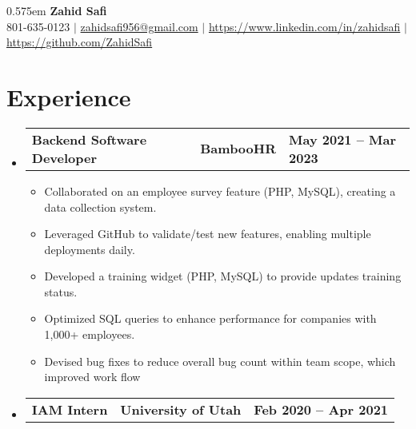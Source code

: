 \documentclass[letterpaper,12pt]{article}
\def\namespaceskip{0.575em}
\begin{document}
\begin{center}
    \spaceskip \namespaceskip \relax
  \textbf{\Huge{Zahid Safi}} \\ \vspace{1pt}
    \small 801-635-0123 $|$ \href{mailto:zahidsafi956@gmail.com}{{zahidsafi956@gmail.com}} $|$ 
    \href{https://www.linkedin.com/in/zahidsafi}{{https://www.linkedin.com/in/zahidsafi}} $|$
    \href{https://github.com/ZahidSafi}{{https://github.com/ZahidSafi}} 
\end{center}


\section{\textbf{Experience}}
\begin{itemize}[leftmargin=0.05in, label={}]
	\item{
	            \begin{tabu} {X[l] X[c] X[r]}
		            \textbf{Backend Software Developer} & \textbf{BambooHR} & \textbf{May 2021 -- Mar 2023} \\
	            \end{tabu}
	            \begin{itemize}[label=$\bullet$]
		            \item{Collaborated on an employee survey feature (PHP, MySQL), creating a data collection
					system.} 
		            \item {Leveraged GitHub to validate/test new features, enabling multiple deployments daily.}
		            \item{Developed a training widget (PHP, MySQL) to provide updates training status.}
		            \item{Optimized SQL queries to enhance performance for companies with 1,000+ employees.}
		            \item{Devised bug fixes to reduce overall bug count within team scope, which improved work flow}
					\linebreak
	            \end{itemize}
	      }

	
	\item{
	            \begin{tabu} {X[l] X[c] X[r]}
		            \textbf{IAM Intern} & \textbf{University of Utah} & \textbf{Feb 2020 -- Apr 2021} \\
	            \end{tabu}

}
\end{itemize}
\end{document}
